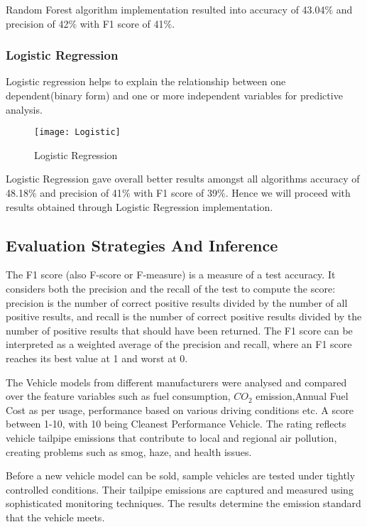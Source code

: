 \documentclass{acm_proc_article-sp}
\begin{document}
Random Forest algorithm implementation resulted into accuracy of 43.04$\%$ and precision of 42$\%$ with F1 score of 41$\%$.

\subsubsection{Logistic Regression}
Logistic regression helps to explain the relationship between one dependent(binary form) and one or more independent variables for predictive analysis.

\begin{figure}[H]
\centering
\texttt{[image: Logistic]}
\caption{Logistic Regression}
\end{figure}

Logistic Regression gave overall better results amongst all algorithms accuracy of 48.18$\%$ and precision of 41$\%$ with F1 score of 39$\%$. 
Hence we will proceed with results obtained through Logistic Regression implementation. 

\subsection{Evaluation Strategies And Inference}
The F1 score (also F-score or F-measure) is a measure of a test accuracy. It considers both the precision and the recall of the test to compute the score: precision is the number of correct positive results divided by the number of all positive results, and recall is the number of correct positive results divided by the number of positive results that should have been returned. The F1 score can be interpreted as a weighted average of the precision and recall, where an F1 score reaches its best value at 1 and worst at 0.

The Vehicle models from different manufacturers were analysed and compared over the feature variables such as fuel consumption, $CO_{2}$ emission,Annual Fuel Cost as per usage, performance based on various driving conditions etc. A score between 1-10, with 10 being Cleanest Performance Vehicle.
The rating reflects vehicle tailpipe emissions that contribute to local and regional air pollution, creating problems such as smog, haze, and health issues. 

Before a new vehicle model can be sold, sample vehicles are tested under tightly controlled conditions. Their tailpipe emissions are captured and measured using sophisticated monitoring techniques. The results determine the emission standard that the vehicle meets.
\end{document}
